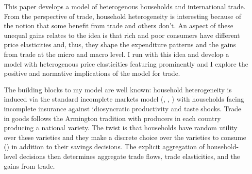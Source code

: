 \documentclass[12pt,pdftex]{article}
\begin{document}
\begin{onehalfspacing}
\hspace{-0.05cm}



\thispagestyle{empty}
\newpage
\normalsize

This paper develops a model of heterogenous households and international trade. From the perspective of trade, household heterogeneity is interesting because of the notion that some benefit from trade and others don't. An aspect of these unequal gains relates to the idea is that rich and poor consumers have different price elasticities and, thus, they shape the expenditure patterns and the gains from trade at the micro and macro level. I run with this idea and develop a model with heterogenous price elasticities featuring prominently and I explore the positive and normative implications of the model for trade.

The building blocks to my model are well known: household heterogeneity is induced via the standard incomplete markets model (\citet{bewley1979optimum}, \citet{huggett1993risk}, \citet{aiyagari1994uninsured}) with households facing incomplete insurance against idiosyncratic productivity and taste shocks. Trade in goods follows the Armington tradition with producers in each country producing a national variety. The twist is that households have random utility over these varieties and they make a discrete choice over the varieties to consume (\citet{mcfadden1974frontiers}) in addition to their savings decisions. The explicit aggregation of household-level decisions then determines aggregate trade flows, trade elasticities, and the gains from trade.



\end{onehalfspacing}
\end{document}

